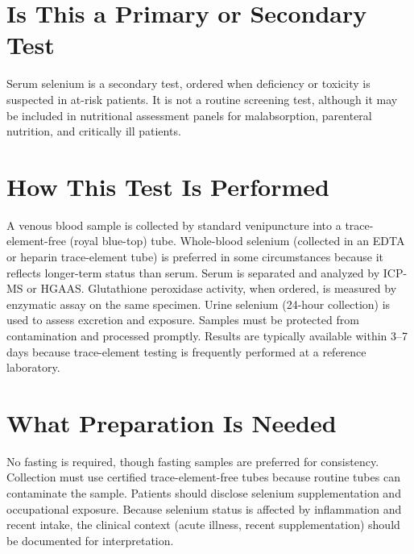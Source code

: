 \section*{Is This a Primary or Secondary Test}
Serum selenium is a secondary test, ordered when deficiency or toxicity is suspected in at-risk patients. It is not a routine screening test, although it may be included in nutritional assessment panels for malabsorption, parenteral nutrition, and critically ill patients.

\section*{How This Test Is Performed}
A venous blood sample is collected by standard venipuncture into a trace-element-free (royal blue-top) tube. Whole-blood selenium (collected in an EDTA or heparin trace-element tube) is preferred in some circumstances because it reflects longer-term status than serum. Serum is separated and analyzed by ICP-MS or HGAAS. Glutathione peroxidase activity, when ordered, is measured by enzymatic assay on the same specimen. Urine selenium (24-hour collection) is used to assess excretion and exposure. Samples must be protected from contamination and processed promptly. Results are typically available within 3--7 days because trace-element testing is frequently performed at a reference laboratory.

\section*{What Preparation Is Needed}
No fasting is required, though fasting samples are preferred for consistency. Collection must use certified trace-element-free tubes because routine tubes can contaminate the sample. Patients should disclose selenium supplementation and occupational exposure. Because selenium status is affected by inflammation and recent intake, the clinical context (acute illness, recent supplementation) should be documented for interpretation.

